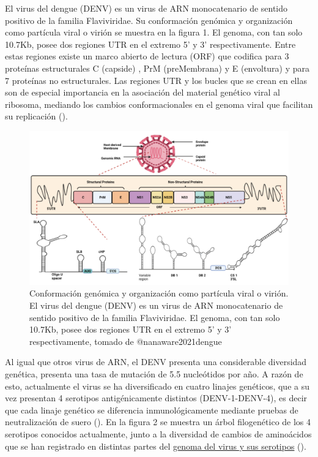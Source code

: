\documentclass[
  12pt, krantz2,
  spanish,
]{krantz}
\begin{document}
El virus del dengue (DENV) es un virus de ARN monocatenario de sentido positivo de la familia Flaviviridae. Su conformación genómica y organización como partícula viral o virión se muestra en la figura 1. El genoma, con tan solo 10.7Kb, posee dos regiones UTR en el extremo 5' y 3' respectivamente. Entre estas regiones existe un marco abierto de lectura (ORF) que codifica para 3 proteínas estructurales C (capside) , PrM (preMembrana) y E (envoltura) y para 7 proteínas no estructurales. Las regiones UTR y los bucles que se crean en ellas son de especial importancia en la asociación del material genético viral al ribosoma, mediando los cambios conformacionales en el genoma viral que facilitan su replicación (\citet{nanaware2021dengue}).

\begin{figure}
\includegraphics[width=0.8\linewidth]{figures/DenvFigura1} \caption{Conformación genómica y organización como partícula viral o virión. El virus del dengue (DENV) es un virus de ARN monocatenario de sentido positivo de la familia Flaviviridae. El genoma, con tan solo 10.7Kb,  posee dos regiones UTR en el extremo 5’ y 3’ respectivamente, tomado de @nanaware2021dengue}\label{fig:genomeDenv}
\end{figure}

Al igual que otros virus de ARN, el DENV presenta una considerable diversidad genética, presenta una tasa de mutación de 5.5 nucleótidos por año. A razón de esto, actualmente el virus se ha diversificado en cuatro linajes genéticos, que a su vez presentan 4 serotipos antigénicamente distintos (DENV-1-DENV-4), es decir que cada linaje genético se diferencia inmunológicamente mediante pruebas de neutralización de suero (\citet{nanaware2021dengue}). En la figura 2 se muestra un árbol filogenético de los 4 serotipos conocidos actualmente, junto a la diversidad de cambios de aminoácidos que se han registrado en distintas partes del \href{https://nextstrain.org/dengue/all}{genoma del virus y sus serotipos} (\citet{hadfield2018nextstrain}).\\
~\\
\end{document}
